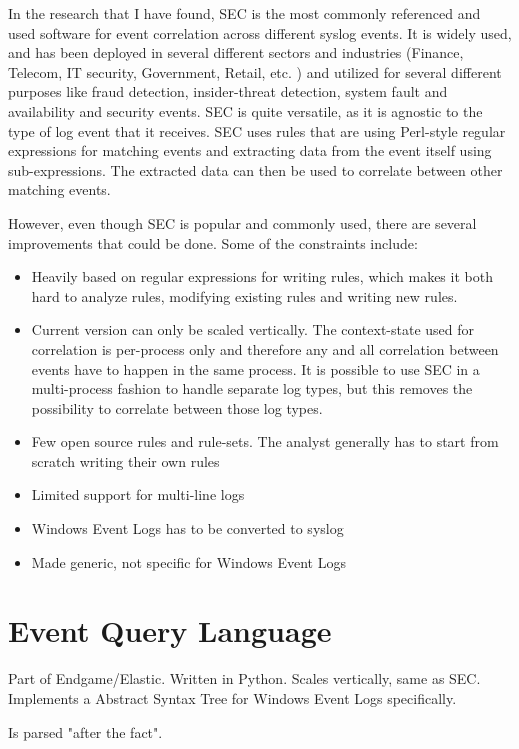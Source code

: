 In the research that I have found, SEC is the most commonly referenced and used software for event correlation across different syslog events. It is widely used, and has been deployed in several different sectors and industries (Finance, Telecom, IT security, Government, Retail, etc. \cite{vaarandi2005tools}) and utilized for several different purposes like fraud detection, insider-threat detection, system fault and availability and security events. SEC is quite versatile, as it is agnostic to the type of log event that it receives. SEC uses rules that are using Perl-style regular expressions for matching events and extracting data from the event itself using sub-expressions. The extracted data can then be used to correlate between other matching events.

However, even though SEC is popular and commonly used, there are several improvements that could be done. Some of the constraints include:
\begin{itemize}
    \item Heavily based on regular expressions for writing rules, which makes it both hard to analyze rules, modifying existing rules and writing new rules.
    \item Current version can only be scaled vertically. The context-state used for correlation is per-process only and therefore any and all correlation between events have to happen in the same process. It is possible to use SEC in a multi-process fashion to handle separate log types, but this removes the possibility to correlate between those log types. 
    \item Few open source rules and rule-sets. The analyst generally has to start from scratch writing their own rules
    \item Limited support for multi-line logs
    \item Windows Event Logs has to be converted to syslog
    \item Made generic, not specific for Windows Event Logs
\end{itemize}

\section{Event Query Language}
\label{sec:eql}

Part of Endgame/Elastic. Written in Python. Scales vertically, same as SEC. Implements a Abstract Syntax Tree for Windows Event Logs specifically.

Is parsed "after the fact".

